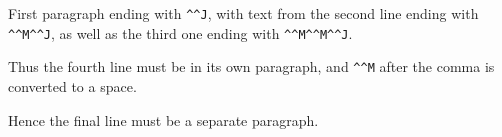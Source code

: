 \documentclass{article}
\begin{document}
First paragraph ending with \verb|^^J|,
with text from the second line ending with \verb|^^M^^J|,
as well as the third one ending with \verb|^^M^^M^^J|.

Thus the fourth line must be in its own paragraph,
and \verb|^^M| after the comma is converted to a space.

Hence the final line must be a separate paragraph.
\end{document}
